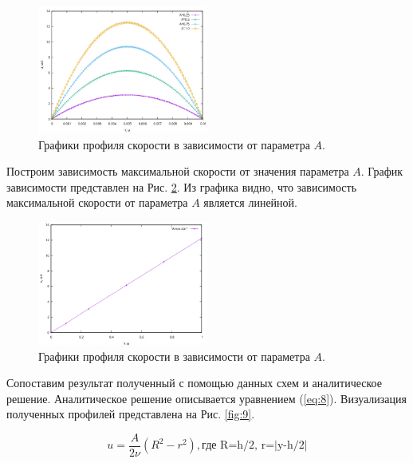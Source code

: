 \begin{figure}[H]
    \centering
    \includegraphics[width=0.5\textwidth]{images/7.png}
    \caption {Графики профиля скорости в зависимости от параметра $A$.}
    \label{fig:7}
\end{figure}

Построим зависимость максимальной скорости от значения параметра $A$. График зависимости представлен на Рис. \ref{fig:8}. Из графика видно, что зависимость максимальной скорости от параметра $A$ является линейной. 
\begin{figure}[H]
    \centering
    \includegraphics[width=0.5\textwidth]{images/8.png}
    \caption {Графики профиля скорости в зависимости от параметра $A$.}
    \label{fig:8}
\end{figure}

Сопоставим результат полученный с помощью данных схем и аналитическое решение. Аналитическое решение описывается уравнением (\ref{eq:8}).
Визуализация полученных профилей представлена на Рис. \ref{fig:9}.

\begin{equation}
    u=\frac{A}{2\nu} (R^2-r^2), \text{где R=h/2, r=|y-h/2|}
\label{eq:8}
\end{equation}


